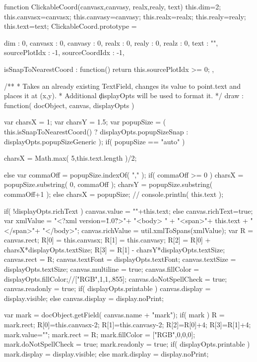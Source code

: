 function ClickableCoord(canvasx,canvasy, realx,realy, text)
{
	this.dim=2;
	this.canvasx=canvasx;
	this.canvasy=canvasy;
	this.realx=realx;
	this.realy=realy;
	this.text=text;
}
ClickableCoord.prototype =
{
	dim : 0,
	canvasx : 0,
	canvasy : 0,
	realx : 0,
	realy : 0,
	realz : 0,
	text : "",
	sourcePlotIdx : -1,
	sourceCoordIdx : -1,

	isSnapToNearestCoord : function() {
		return this.sourcePlotIdx >= 0;
	},

	/**
	 * Takes an already existing TextField, changes its value to point.text and places it at (x,y).
	 * Additional \c displayOpts will be used to format it.
	 */
	draw : function( docObject, canvas, displayOpts )
	{
		var charsX = 1;
		var charsY = 1.5;
		var popupSize = ( this.isSnapToNearestCoord() ? displayOpts.popupSizeSnap : displayOpts.popupSizeGeneric );
		if( popupSize == "auto" ) {
			charsX = Math.max( 5,this.text.length )/2;

		} else {
			var commaOff = popupSize.indexOf( "," );
			if( commaOff >= 0 ) {
				charsX = popupSize.substring( 0, commaOff );
				charsY = popupSize.substring( commaOff+1 );
			} else
				charsX = popupSize;
		}
	//	console.println( this.text );

		if( !displayOpts.richText  )
			canvas.value = ""+this.text;
		else {
			canvas.richText=true;
			var xmlValue = "<?xml version=\"1.0\"?>"+
				"<body> " + %
				"<span>"+ %
					this.text +
				"</span>"+
				"</body>";
			canvas.richValue = util.xmlToSpans(xmlValue);
	 	}
		var R = canvas.rect;
		R[0] = this.canvasx;
		R[1] = this.canvasy;
		R[2] = R[0] + charsX*displayOpts.textSize;
		R[3] = R[1] - charsY*displayOpts.textSize;
		canvas.rect = R;
		canvas.textFont = displayOpts.textFont;
		canvas.textSize = displayOpts.textSize;
		canvas.multiline = true;
		canvas.fillColor = displayOpts.fillColor;//["RGB",1,1,.855];
		canvas.doNotSpellCheck = true;
		canvas.readonly = true;
		if( displayOpts.printable )
			canvas.display = display.visible;
		else
			canvas.display = display.noPrint;

		var mark = docObject.getField( canvas.name + "mark");
		if( mark ) {
			R = mark.rect;
			R[0]=this.canvasx-2;
			R[1]=this.canvasy-2;
			R[2]=R[0]+4;
			R[3]=R[1]+4;
			mark.value="";
			mark.rect = R;
			mark.fillColor = ["RGB",0,0,0];
			mark.doNotSpellCheck = true;
			mark.readonly = true;
			if( displayOpts.printable )
				mark.display = display.visible;
			else
				mark.display = display.noPrint;
		}
	}
}



